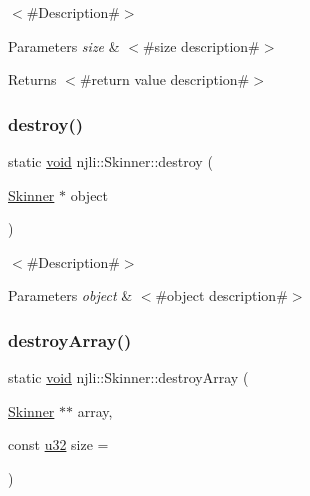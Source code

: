 $<$\#\+Description\#$>$


\begin{DoxyParams}{Parameters}
{\em size} & $<$\#size description\#$>$\\
\hline
\end{DoxyParams}
\begin{DoxyReturn}{Returns}
$<$\#return value description\#$>$ 
\end{DoxyReturn}
\mbox{\label{classnjli_1_1_skinner_a977a61c154a63f6d1517a99dbb11ab68}} 
\subsubsection{\texorpdfstring{destroy()}{destroy()}}
{\footnotesize\ttfamily static \mbox{\hyperlink{_thread_8h_af1e856da2e658414cb2456cb6f7ebc66}{void}} njli\+::\+Skinner\+::destroy (\begin{DoxyParamCaption}\item[{\mbox{\hyperlink{classnjli_1_1_skinner}{Skinner}} $\ast$}]{object }\end{DoxyParamCaption})\hspace{0.3cm}{\ttfamily [static]}}

$<$\#\+Description\#$>$


\begin{DoxyParams}{Parameters}
{\em object} & $<$\#object description\#$>$ \\
\hline
\end{DoxyParams}
\mbox{\label{classnjli_1_1_skinner_aaaec43167e79100f72744b21f5c4e370}} 
\subsubsection{\texorpdfstring{destroy\+Array()}{destroyArray()}}
{\footnotesize\ttfamily static \mbox{\hyperlink{_thread_8h_af1e856da2e658414cb2456cb6f7ebc66}{void}} njli\+::\+Skinner\+::destroy\+Array (\begin{DoxyParamCaption}\item[{\mbox{\hyperlink{classnjli_1_1_skinner}{Skinner}} $\ast$$\ast$}]{array,  }\item[{const \mbox{\hyperlink{_util_8h_a10e94b422ef0c20dcdec20d31a1f5049}{u32}}}]{size = {} }\end{DoxyParamCaption})\hspace{0.3cm}{\ttfamily [static]}}

